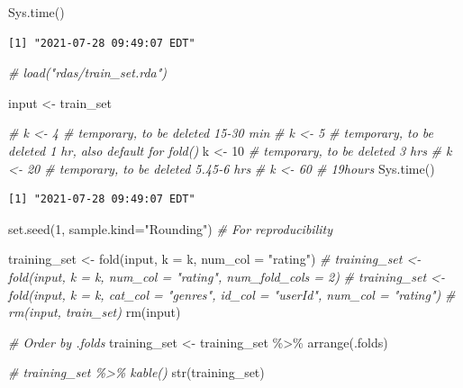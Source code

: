 \documentclass[
]{article}
\newenvironment{Shaded}{}{}
\newcommand{\AttributeTok}[1]{\textcolor[rgb]{0.49,0.56,0.16}{#1}}
\newcommand{\CommentTok}[1]{\textcolor[rgb]{0.38,0.63,0.69}{\textit{#1}}}
\newcommand{\DecValTok}[1]{\textcolor[rgb]{0.25,0.63,0.44}{#1}}
\newcommand{\FunctionTok}[1]{\textcolor[rgb]{0.02,0.16,0.49}{#1}}
\newcommand{\NormalTok}[1]{#1}
\newcommand{\OtherTok}[1]{\textcolor[rgb]{0.00,0.44,0.13}{#1}}
\newcommand{\SpecialCharTok}[1]{\textcolor[rgb]{0.25,0.44,0.63}{#1}}
\newcommand{\StringTok}[1]{\textcolor[rgb]{0.25,0.44,0.63}{#1}}
\begin{document}
\begin{Shaded}
\begin{Highlighting}[]
\FunctionTok{Sys.time}\NormalTok{()}
\end{Highlighting}
\end{Shaded}

\begin{verbatim}
[1] "2021-07-28 09:49:07 EDT"
\end{verbatim}

\begin{Shaded}
\begin{Highlighting}[]
\CommentTok{\# load("rdas/train\_set.rda")}

\NormalTok{input }\OtherTok{\textless{}{-}}\NormalTok{ train\_set}

\CommentTok{\# k \textless{}{-} 4 \# temporary, to be deleted  15{-}30 min}
\CommentTok{\# k \textless{}{-} 5 \# temporary, to be deleted  1 hr, also default for fold()}
\NormalTok{k }\OtherTok{\textless{}{-}} \DecValTok{10} \CommentTok{\# temporary, to be deleted 3 hrs}
\CommentTok{\# k \textless{}{-} 20 \# temporary, to be deleted 5.45{-}6 hrs}
\CommentTok{\# k \textless{}{-} 60 \#                          19hours}
\FunctionTok{Sys.time}\NormalTok{()}
\end{Highlighting}
\end{Shaded}

\begin{verbatim}
[1] "2021-07-28 09:49:07 EDT"
\end{verbatim}

\begin{Shaded}
\begin{Highlighting}[]
\FunctionTok{set.seed}\NormalTok{(}\DecValTok{1}\NormalTok{, }\AttributeTok{sample.kind=}\StringTok{"Rounding"}\NormalTok{) }\CommentTok{\# For reproducibility}

\NormalTok{training\_set }\OtherTok{\textless{}{-}} \FunctionTok{fold}\NormalTok{(input, }\AttributeTok{k =}\NormalTok{ k, }\AttributeTok{num\_col =} \StringTok{"rating"}\NormalTok{)}
\CommentTok{\# training\_set \textless{}{-} fold(input, k = k, num\_col = "rating", num\_fold\_cols = 2)}
\CommentTok{\# training\_set \textless{}{-} fold(input, k = k, cat\_col = "genres", id\_col = "userId", num\_col = "rating")}
\CommentTok{\# rm(input, train\_set)}
\FunctionTok{rm}\NormalTok{(input)}

\CommentTok{\# Order by .folds}
\NormalTok{training\_set }\OtherTok{\textless{}{-}}\NormalTok{ training\_set }\SpecialCharTok{\%\textgreater{}\%} \FunctionTok{arrange}\NormalTok{(.folds)}

\CommentTok{\# training\_set \%\textgreater{}\% kable()}
\FunctionTok{str}\NormalTok{(training\_set)}
\end{Highlighting}
\end{Shaded}
\end{document}
